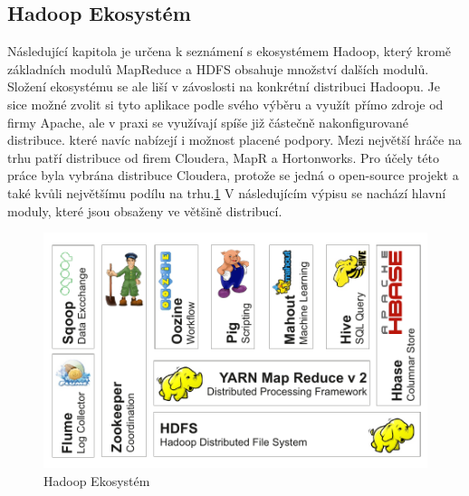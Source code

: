 \documentclass[thesis=M,czech]{FITthesis}[2012/06/26]
\begin{document}
\clearpage
\subsection{Hadoop Ekosystém}
Následující kapitola je určena k seznámení s ekosystémem Hadoop, který kromě základních modulů MapReduce a HDFS obsahuje množství dalších modulů. Složení ekosystému se ale liší v závoslosti na konkrétní distribuci Hadoopu. Je sice možné zvolit si tyto aplikace podle svého výběru a využít přímo zdroje od firmy Apache, ale v praxi se využívají spíše již částečně nakonfigurované distribuce. které navíc nabízejí i možnost placené podpory. Mezi největší hráče na trhu patří distribuce od firem Cloudera, MapR a Hortonworks.\cite{CLOUDERA} Pro účely této práce byla vybrána distribuce Cloudera, protože se jedná o open-source projekt a také kvůli největšímu podílu na trhu.\ref{fig:eko} V následujícím výpisu se nachází hlavní moduly, které jsou obsaženy ve většině distribucí.

\begin{figure}[h]\centering
	\includegraphics[width=1\textwidth, angle=0]{files/HadoopEco}
	\caption[Hadoop Ekosystém]{Hadoop Ekosystém}\label{fig:eko}
\end{figure}
\end{document}
